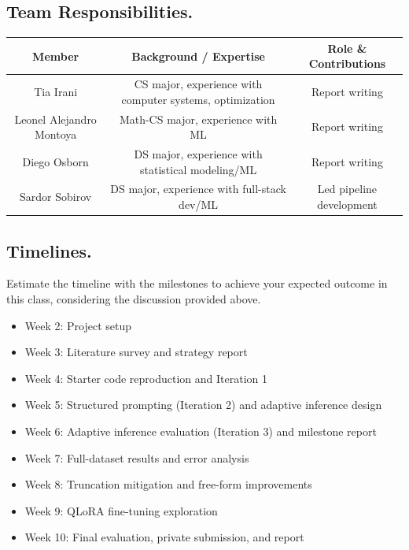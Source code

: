 \documentclass{article}
\begin{document}
\subsection{Team Responsibilities.}
\begin{center}
\def\arraystretch{1.5}
\begin{tabular}{||c | c | c||}
    \hline
    \textbf{Member} & \textbf{Background / Expertise} & \textbf{Role \& Contributions}\\
    \hline
    Tia Irani & CS major, experience with computer systems, optimization & Report writing \\
    \hline
    Leonel Alejandro Montoya & Math-CS major, experience with ML & Report writing \\
    \hline
    Diego Osborn & DS major, experience with statistical modeling/ML & Report writing \\
    \hline
    Sardor Sobirov & DS major, experience with full-stack dev/ML & Led pipeline development\\
    \hline
\end{tabular}
\end{center}

\subsection{Timelines.}
Estimate the timeline with the milestones to achieve your expected outcome in this class, considering the discussion provided above.
\begin{itemize}
    \item Week 2: Project setup
    \item Week 3: Literature survey and strategy report
    \item Week 4: Starter code reproduction and Iteration 1
    \item Week 5: Structured prompting (Iteration 2) and adaptive inference design
    \item Week 6: Adaptive inference evaluation (Iteration 3) and milestone report
    \item Week 7: Full-dataset results and error analysis
    \item Week 8: Truncation mitigation and free-form improvements
    \item Week 9: QLoRA fine-tuning exploration
    \item Week 10: Final evaluation, private submission, and report
\end{itemize}
\end{document}
